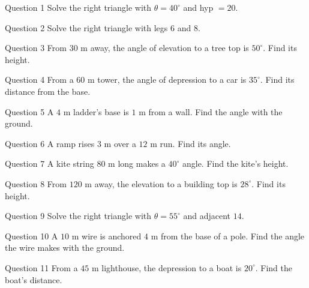 \documentclass[11pt]{article}
\begin{document}
\begin{qbox}{Question 1}
Solve the right triangle with $\theta=40^\circ$ and hyp $=20$.\workspace{2.6cm}
\end{qbox}

\begin{qbox}{Question 2}
Solve the right triangle with legs $6$ and $8$.\workspace{2.6cm}
\end{qbox}

\begin{qbox}{Question 3}
From $30$ m away, the angle of elevation to a tree top is $50^\circ$. Find its height.\workspace{2.4cm}
\end{qbox}

\begin{qbox}{Question 4}
From a $60$ m tower, the angle of depression to a car is $35^\circ$. Find its distance from the base.\workspace{2.6cm}
\end{qbox}

\begin{qbox}{Question 5}
A $4$ m ladder's base is $1$ m from a wall. Find the angle with the ground.\workspace{2.4cm}
\end{qbox}

\begin{qbox}{Question 6}
A ramp rises $3$ m over a $12$ m run. Find its angle.\workspace{2.2cm}
\end{qbox}

\begin{qbox}{Question 7}
A kite string $80$ m long makes a $40^\circ$ angle. Find the kite's height.\workspace{2.2cm}
\end{qbox}

\begin{qbox}{Question 8}
From $120$ m away, the elevation to a building top is $28^\circ$. Find its height.\workspace{2.4cm}
\end{qbox}

\begin{qbox}{Question 9}
Solve the right triangle with $\theta=55^\circ$ and adjacent $14$.\workspace{2.6cm}
\end{qbox}

\begin{qbox}{Question 10}
A $10$ m wire is anchored $4$ m from the base of a pole. Find the angle the wire makes with the ground.\workspace{2.4cm}
\end{qbox}

\begin{qbox}{Question 11}
From a $45$ m lighthouse, the depression to a boat is $20^\circ$. Find the boat's distance.\workspace{2.4cm}
\end{qbox}
\end{document}
